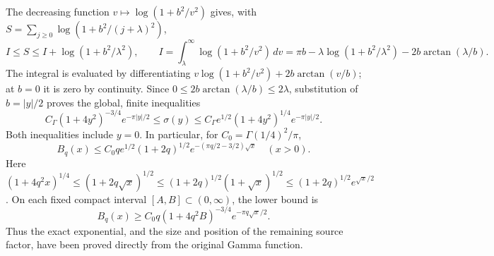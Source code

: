 \documentclass[11pt,a4paper]{article}
\begin{document}
The decreasing function \(v\mapsto\log(1+b^2/v^2)\) gives, with
\(S=\sum_{j\geq0}\log(1+b^2/(j+\lambda)^2)\),
\[
 I\leq S\leq I+\log(1+b^2/\lambda^2),\qquad
 I=\int_\lambda^\infty\log(1+b^2/v^2)\,dv
  =\pi b-\lambda\log(1+b^2/\lambda^2)
                      -2b\arctan(\lambda/b).
\]
The integral is evaluated by differentiating
\(v\log(1+b^2/v^2)+2b\arctan(v/b)\); at \(b=0\) it is zero
by continuity. Since \(0\leq2b\arctan(\lambda/b)\leq2\lambda\),
substitution of \(b=|y|/2\) proves the global, finite inequalities
\[
 \boxed{C_\Gamma(1+4y^2)^{-3/4}e^{-\pi|y|/2}
 \leq\sigma(y)\leq
 C_\Gamma e^{1/2}(1+4y^2)^{1/4}e^{-\pi|y|/2}.}
 \tag{GEL4}
\]
Both inequalities include \(y=0\). In particular, for
\(C_0=\Gamma(1/4)^2/\pi\),
\[
 B_q(x)\leq C_0q e^{1/2}(1+2q)^{1/2}
            e^{-(\pi q/2-3/2)\sqrt x}\quad(x>0).
 \tag{GEL5}
\]
Here \((1+4q^2x)^{1/4}\leq(1+2q\sqrt x)^{1/2}
\leq(1+2q)^{1/2}(1+\sqrt x)^{1/2}
\leq(1+2q)^{1/2}e^{\sqrt x/2}\). On each fixed compact interval
\([A,B]\subset(0,\infty)\), the lower bound is
\[
 B_q(x)\geq C_0q(1+4q^2B)^{-3/4}e^{-\pi q\sqrt x/2}.
 \tag{GEL6}
\]
Thus the exact exponential, and the size and position of the remaining
source factor, have been proved directly from the original Gamma function.
\end{document}
